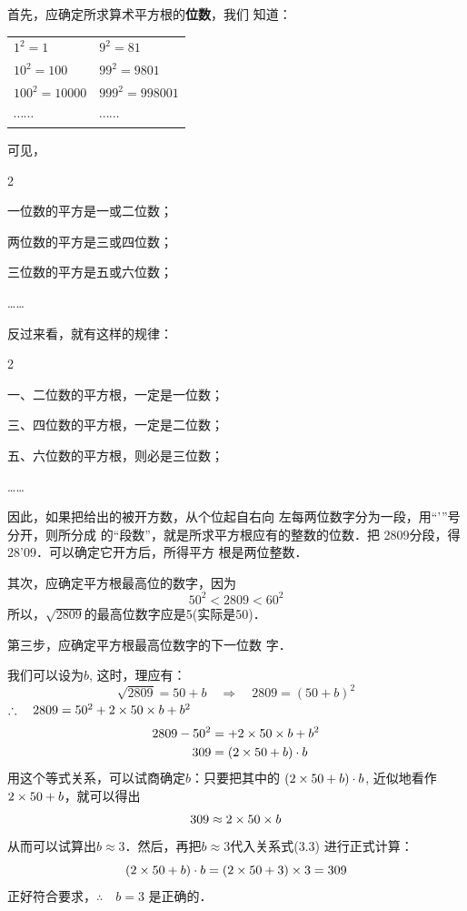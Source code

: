 \begin{solution}
    首先，应确定所求算术平方根的\textbf{位数}，我们
知道：
\begin{center}
    \begin{tabular}{ll}
       $1^2=1$   &  $9^2=81$ \\
       $10^2=100$   &  $99^2=9801$ \\
       $100^2=10000$   &  $999^2=998001$ \\
       $\cdots\cdots$   &  $\cdots\cdots$ \\ 
    \end{tabular}
\end{center}

可见，
\begin{itemize}
    \begin{multicols}{2}
         \item 一位数的平方是一或二位数；
    \item 两位数的平方是三或四位数；
    \item 三位数的平方是五或六位数；
    \item ……
    \end{multicols}
   
\end{itemize}


反过来看，就有这样的规律：
\begin{itemize}
    \begin{multicols}{2}
         \item 一、二位数的平方根，一定是一位数；
    \item 三、四位数的平方根，一定是二位数；
    \item 五、六位数的平方根，则必是三位数；
    \item ……
    \end{multicols}
   
\end{itemize}

因此，如果把给出的被开方数，从个位起自右向
左每两位数字分为一段，用“'”号分开，则所分成
的“段数”，就是所求平方根应有的整数的位数．把
2809分段，得28'09．可以确定它开方后，所得平方
根是两位整数．

其次，应确定平方根最高位的数字，因为
$$50^2<2809<60^2$$
所以，$\sqrt{2809}$的最高位数字应是5(实际是50)．

第三步，应确定平方根最高位数字的下一位数
字．

我们可以设为$b$, 这时，理应有：
\[\sqrt{2809}=50+b  \quad \Rightarrow\quad 2809=(50+b)^2\]
$\therefore\quad 2809=50^2+2\times 50\times b+b^2$
\begin{align}
    2809-50^2&=+2\times 50\times b+b^2 \nonumber \\
    309&=(2\times 50+b)\cdot b
\end{align}
用这个等式关系，可以试商确定$b$：只要把其中的
$(2\times50+b)\cdot b$, 近似地看作$2\times50+b$，就可以得出
\[309\approx 2\times50\times b\]
从而可以试算出$b\approx 3$．然后，再把$b\approx 3$代入关系式(3.3)
进行正式计算：
\[(2\times50+b)\cdot b=(2\times50+3)\times3=309\]
正好符合要求，$\therefore\quad b=3$ 是正确的．


\end{solution}
